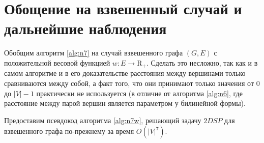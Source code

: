 \chapter{Обощение на взвешенный случай и дальнейшие наблюдения}

Обобщим алгоритм \ref{alg:n7} на случай взвешенного графа $(G, E)$ с положительной весовой функцией $w : E \rightarrow \mathrm{R}_+$. Сделать это несложно, так как и в самом алгоритме и в его доказательстве расстояния между вершинами только сравниваются между собой, а факт того, что они принимают только значения от $0$ до $|V| - 1$ практически не используется (в отличие от алгоритма \ref{alg:n6}, где расстояние между парой вершин является параметром у билинейной формы).

Предоставим псевдокод алгоритма \ref{alg:n7w}, решающий задачу $2DSP$ для взвешенного графа по-прежнему за время $O(|V|^7)$. 


